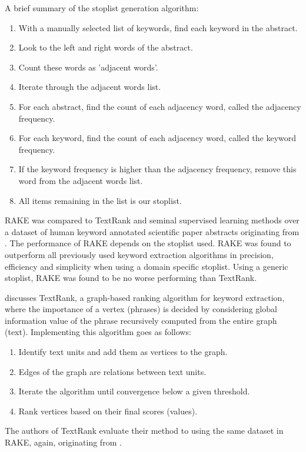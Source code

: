 \documentclass[11pt,a4paper]{article}
\begin{document}
A brief summary of the stoplist generation algorithm:
\begin{enumerate}
	\item With a manually selected list of keywords, find each keyword in the abstract.
	\item Look to the left and right words of the abstract.
	\item Count these words as 'adjacent words'.
	\item Iterate through the adjacent words list.
	\item For each abstract, find the count of each adjacency word, called the adjacency frequency.
	\item For each keyword, find the count of each adjacency word, called the keyword frequency.
	\item If the keyword frequency is higher than the adjacency frequency, remove this word from the adjacent words list.
	\item All items remaining in the list is our stoplist. 
\end{enumerate}

RAKE was compared to TextRank and seminal supervised learning methods \citep{hulth-2003-improved} over a dataset of human keyword annotated scientific paper abstracts originating from \citet{hulth-2003-improved}. The performance of RAKE depends on the stoplist used. RAKE was found to outperform all previously used keyword extraction algorithms in precision, efficiency and simplicity when using a domain specific stoplist. Using a generic stoplist, RAKE was found to be no worse performing than TextRank.

\citet{4} discusses TextRank, a graph-based ranking algorithm for keyword extraction, where the importance of a vertex (phrases) is decided by considering global information value of the phrase recursively computed from the entire graph (text). Implementing this algorithm goes as follows:

\begin{enumerate}
\item Identify text units and add them as vertices to the graph.
\item Edges of the graph are relations between text units.
\item Iterate the algorithm until convergence below a given threshold. 
\item Rank vertices based on their final scores (values).
\end{enumerate}   

The authors of TextRank evaluate their method to \citet{hulth-2003-improved} using the same dataset in RAKE, again, originating from \citet{hulth-2003-improved}.
\end{document}
